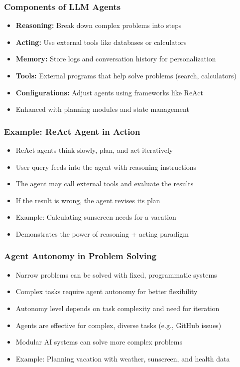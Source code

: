 \begin{frame}[fragile]\frametitle{Components of LLM Agents}
\begin{itemize}
    \item \textbf{Reasoning:} Break down complex problems into steps
    \item \textbf{Acting:} Use external tools like databases or calculators
    \item \textbf{Memory:} Store logs and conversation history for personalization
    \item \textbf{Tools:} External programs that help solve problems (search, calculators)
    \item \textbf{Configurations:} Adjust agents using frameworks like ReAct
    \item Enhanced with planning modules and state management
\end{itemize}
\end{frame}

\begin{frame}[fragile]\frametitle{Example: ReAct Agent in Action}
\begin{itemize}
    \item ReAct agents think slowly, plan, and act iteratively
    \item User query feeds into the agent with reasoning instructions
    \item The agent may call external tools and evaluate the results
    \item If the result is wrong, the agent revises its plan
    \item Example: Calculating sunscreen needs for a vacation
    \item Demonstrates the power of reasoning + acting paradigm
\end{itemize}
\end{frame}

\begin{frame}[fragile]\frametitle{Agent Autonomy in Problem Solving}
\begin{itemize}
    \item Narrow problems can be solved with fixed, programmatic systems
    \item Complex tasks require agent autonomy for better flexibility
    \item Autonomy level depends on task complexity and need for iteration
    \item Agents are effective for complex, diverse tasks (e.g., GitHub issues)
    \item Modular AI systems can solve more complex problems
    \item Example: Planning vacation with weather, sunscreen, and health data
\end{itemize}
\end{frame}

